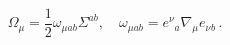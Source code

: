 \begin{equation}\label{eq:spinconnection}
  \Omega_\mu=\frac{1}{2} \omega_{\mu ab}\Sigma^{ab},\quad
\omega_{\mu ab}=e^\nu{}_a \nabla_\mu e_\nu{}_b  \, .
\end{equation}

